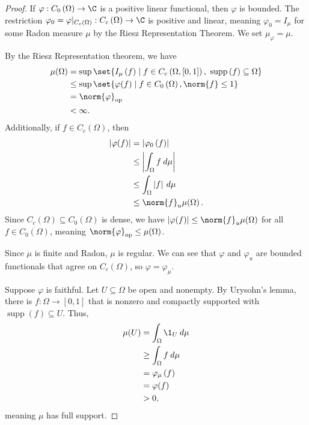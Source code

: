 \documentclass[10pt]{mypackage}
\DeclareMathOperator{\supp}{supp}
\begin{document}
\begin{proof}
  If $\varphi: C_0\left(\Omega\right)\rightarrow \C$ is a positive linear functional, then $\varphi$ is bounded. The restriction $\varphi_0 = \varphi|_{C_c\left(\Omega\right)}: C_c\left(\Omega\right)\rightarrow \C$ is positive and linear, meaning $\varphi_0 = I_{\mu}$ for some Radon measure $\mu$ by the Riesz Representation Theorem. We set $\mu_{\varphi} = \mu$.\newline

  By the Riesz Representation theorem, we have
  \begin{align*}
    \mu\!\left(\Omega\right) &= \sup\set{I_{\mu}\left(f\right)\mid f\in C_c\left(\Omega,[0,1]\right),~\supp\left(f\right) \subseteq \Omega}\\
                             &\leq \sup\set{\varphi(f)\mid f\in C_0\left(\Omega\right),\norm{f}\leq 1}\\
                             &= \norm{\varphi}_{\text{op}}\\
                             &< \infty.
  \end{align*}
  Additionally, if $f\in C_c\left(\Omega\right)$, then
  \begin{align*}
    \left\vert \varphi(f) \right\vert &= \left\vert \varphi_0\left(f\right) \right\vert\\
                                      &\leq \left\vert \int_{\Omega}f\:d\mu \right\vert\\
                                      &\leq \int_{\Omega}\left\vert f \right\vert\:d\mu\\
                                      &\leq \norm{f}_{u}\mu\!\left(\Omega\right).
  \end{align*}
  Since $C_c\left(\Omega\right)\subseteq C_0\left(\Omega\right)$ is dense, we have $\left\vert \varphi(f) \right\vert\leq \norm{f}_u\mu\!\left(\Omega\right)$ for all $f\in C_0\left(\Omega\right)$, meaning $\norm{\varphi}_{\text{op}}\leq \mu\!\left(\Omega\right)$.\newline

  Since $\mu$ is finite and Radon, $\mu$ is regular. We can see that $\varphi$ and $\varphi_u$ are bounded functionals that agree on $C_c\left(\Omega\right)$, so $\varphi = \varphi_{\mu}$.\newline

  Suppose $\varphi$ is faithful. Let $U\subseteq \Omega$ be open and nonempty. By Urysohn's lemma, there is $f: \Omega\rightarrow [0,1]$ that is nonzero and compactly supported with $\supp(f) \subseteq U$. Thus,
  \begin{align*}
    \mu\!\left(U\right) &= \int_{\Omega}\1_{U}\:d\mu\\
                        &\geq \int_{\Omega}f\:d\mu\\
                        &= \varphi_{\mu}\left(f\right)\\
                        &= \varphi(f)\\
                        &> 0,
  \end{align*}
  meaning $\mu$ has full support.
\end{proof}
\end{document}
